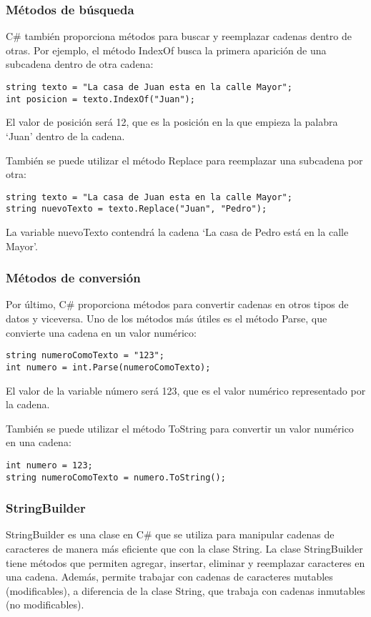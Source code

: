 \documentclass[executivepaper]{article}
\begin{document}
\subsubsection*{Métodos de búsqueda}

C\# también proporciona métodos para buscar y reemplazar cadenas dentro de otras. Por ejemplo, el método IndexOf busca la primera aparición de una subcadena dentro de otra cadena:
\begin{lstlisting}
string texto = "La casa de Juan esta en la calle Mayor";
int posicion = texto.IndexOf("Juan");    
\end{lstlisting}
El valor de posición será 12, que es la posición en la que empieza la palabra \enquote*{Juan} dentro de la cadena.

También se puede utilizar el método Replace para reemplazar una subcadena por otra:
\begin{lstlisting}
string texto = "La casa de Juan esta en la calle Mayor";
string nuevoTexto = texto.Replace("Juan", "Pedro");
\end{lstlisting}
La variable nuevoTexto contendrá la cadena \enquote*{La casa de Pedro está en la calle Mayor}.

\subsubsection*{Métodos de conversión}

Por último, C\# proporciona métodos para convertir cadenas en otros tipos de datos y viceversa. Uno de los métodos más útiles es el método Parse, que convierte una cadena en un valor numérico:
\begin{lstlisting}
string numeroComoTexto = "123";
int numero = int.Parse(numeroComoTexto);    
\end{lstlisting}
El valor de la variable número será 123, que es el valor numérico representado por la cadena.

También se puede utilizar el método ToString para convertir un valor numérico en una cadena:

\begin{lstlisting}
int numero = 123;
string numeroComoTexto = numero.ToString();    
\end{lstlisting}

\subsubsection*{StringBuilder}

StringBuilder es una clase en C\# que se utiliza para manipular cadenas de caracteres de manera más eficiente que con la clase String. La clase StringBuilder tiene métodos que permiten agregar, insertar, eliminar y reemplazar caracteres en una cadena. Además, permite trabajar con cadenas de caracteres mutables (modificables), a diferencia de la clase String, que trabaja con cadenas inmutables (no modificables).
\end{document}
